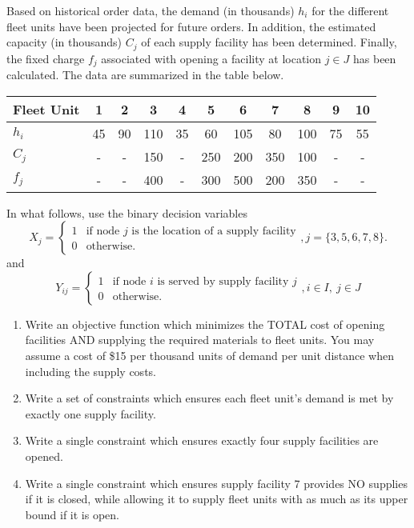 \documentclass[12pt]{article}
\newcommand{\binvar}[1]{\left\{
    \begin{array}{ll}
      1 & \mbox{#1} \\
      0 & \mbox{otherwise.}
    \end{array}
    \right.}
\begin{document}
\begin{enumerate}
\noindent
Based on historical order data, the demand (in thousands) $h_i$ for the different fleet units have been projected for future orders.  In addition, the estimated capacity (in thousands) $C_j$ of each supply facility has been determined.  Finally, the fixed charge $f_j$ associated with opening a facility at location $j \in J$ has been calculated.  The data are summarized in the table below.

\vspace{0.3 cm}
\begin{tabular}{l|c|c|c|c|c|c|c|c|c|c|}
Fleet Unit &  1	&	2	&	3	&	4	&
5	&	6	&	7	&	8	&        9         &    10
\\
\hline
$h_i$ & 45	&	90	&	110	&	35	&	60	&	105	&	80	&	100	&  75    &    55 \\
\hline
$C_j$ & -	&	-	&	150	&	-	&	250	&	200	&	350	&	100	&  -    &    - \\
\hline
$f_j$ & -	&	-	&	400	&	-	&	300	&	500	&	200	&	350	&  -    &    -
\end{tabular}
\vspace{0.3 cm}

\noindent
In what follows, use the binary decision variables
\[
X_j = \binvar{if node $j$ is the location of a supply facility}, j =\{3,5,6,7,8\}.
\]
and 
\[
Y_{ij} = \binvar{if node $i$ is served by supply facility $j$}, i \in I,~ j \in J
\]

\newpage

\begin{enumerate}
    \item Write an objective function which minimizes the TOTAL cost of opening facilities AND supplying the required materials to fleet units.  You may assume a cost of \$15 per thousand units of demand per unit distance when including the supply costs.
    
    \vfill
    
    \item Write a set of constraints which ensures each fleet unit's demand is met by exactly one supply facility.

    \vfill

    \item Write a single constraint which ensures exactly four supply facilities are opened.

    \vfill

    \item Write a single constraint which ensures supply facility 7 provides NO supplies if it is closed, while allowing it to supply fleet units with as much as its upper bound if it is open.


\end{enumerate}
\end{enumerate}
\end{document}
